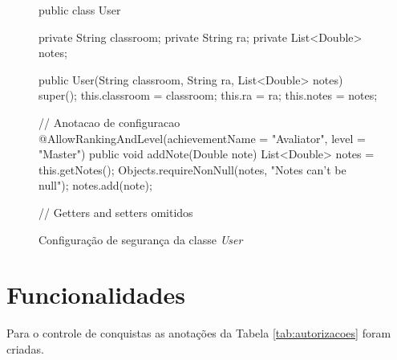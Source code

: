 \begin{figure}[H]
    \centering
    \begin{java}
    public class User {

	private String classroom;
	private String ra;
	private List<Double> notes;

	public User(String classroom, String ra, List<Double> notes) {
		super();
		this.classroom = classroom;
		this.ra = ra;
		this.notes = notes;
	}
    
    // Anotacao de configuracao
	@AllowRankingAndLevel(achievementName = "Avaliator", level = "Master")
	public void addNote(Double note) {
		List<Double> notes = this.getNotes();
		Objects.requireNonNull(notes, "Notes can't be null");
		notes.add(note);
	}
	
	// Getters and setters omitidos
	
	}
    \end{java}
    \caption{Configuração de segurança da classe \textit{User}}
    \label{fig:execao-configuracao}
\end{figure}

\section{Funcionalidades}

\par Para o controle de conquistas as anotações da Tabela \ref{tab:autorizacoes} foram criadas.

